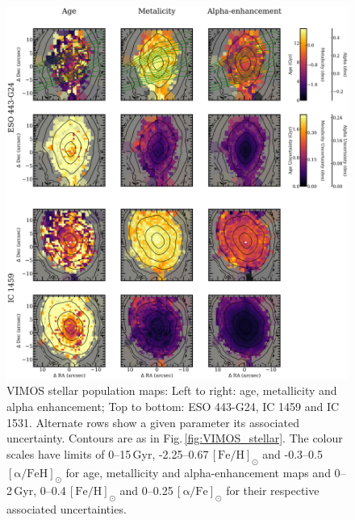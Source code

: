 		\begin{figure}
			\centering
			\includegraphics[height=0.94\textheight]{chapter4/vimos/pop1.png}
			\caption[VIMOS stellar population maps]{VIMOS stellar population maps: Left to right: age, metallicity and alpha enhancement; Top to bottom: ESO 443-G24, IC 1459 and IC 1531. Alternate rows show a given parameter its associated uncertainty. Contours are as in Fig.\,\ref{fig:VIMOS_stellar}. The colour scales have limits of 0--15\,Gyr, -2.25--0.67\,$\mathrm{[Fe/H]_\odot}$ and -0.3--0.5\,$\mathrm{[\alpha/FeH]_\odot}$ for age, metallicity and alpha-enhancement maps and 0--2\,Gyr, 0--0.4\,$\mathrm{[Fe/H]_\odot}$ and 0--0.25\,$\mathrm{[\alpha/Fe]_\odot}$ for their respective associated uncertainties.}
			\label{fig:VIMOS_pop}
		\end{figure}
